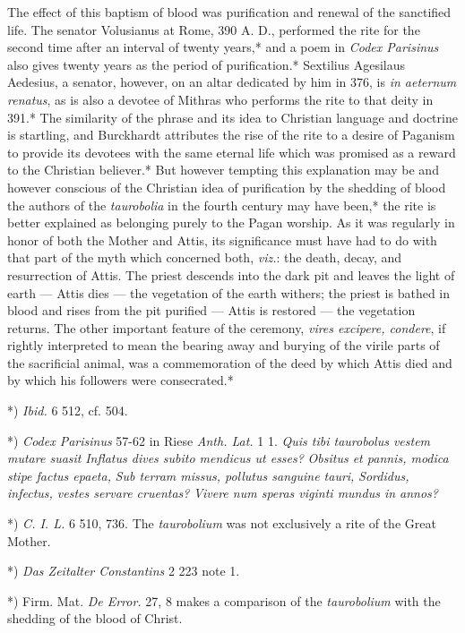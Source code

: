 \documentclass[a4paper, 11pt, oneside, polutonikogreek, english]{article}
\begin{document}
The effect of this baptism of blood was purification and renewal of the sanctified life. The senator Volusianus at Rome, 390 A. D., performed the rite for the second time after an interval of twenty years,* and a poem in \emph{Codex Parisinus} also gives twenty years as the period of purification.* Sextilius Agesilaus Aedesius, a senator, however, on an altar dedicated by him in 376, is \emph{in aeternum renatus}, as is also a devotee of Mithras who performs the rite to that deity in 391.* The similarity of the phrase and its idea to Christian language and doctrine is startling, and Burckhardt attributes the rise of the rite to a desire of Paganism to provide its devotees with the same eternal life which was promised as a reward to the Christian believer.* But however tempting this explanation may be and however conscious of the Christian idea of purification by the shedding of blood the authors of the \emph{taurobolia} in the fourth century may have been,* the rite is better explained as belonging purely to the Pagan worship. As it was regularly in honor of both the Mother and Attis, its significance must have had to do with that part of the myth which concerned both, \emph{viz.}: the death, decay, and resurrection of Attis. The priest descends into the dark pit and leaves the light of earth --- Attis dies --- the vegetation of the earth withers; the priest is bathed in blood and rises from the pit purified --- Attis is restored --- the vegetation returns. The other important feature of the ceremony, \emph{vires excipere, condere}, if rightly interpreted to mean the bearing away and burying of the virile parts of the sacrificial animal, was a commemoration of the deed by which Attis died and by which his followers were consecrated.*

*) \emph{Ibid.} 6 512, cf. 504.

*) \emph{Codex Parisinus} 57-62 in Riese \emph{Anth. Lat.} 1 1.  
\emph{Quis tibi taurobolus vestem mutare suasit}  
\emph{Inflatus dives subito mendicus ut esses?}  
\emph{Obsitus et pannis, modica stipe factus epaeta,}  
\emph{Sub terram missus, pollutus sanguine tauri,}  
\emph{Sordidus, infectus, vestes servare cruentas?}  
\emph{Vivere num speras viginti mundus in annos?}

*) \emph{C. I. L.} 6 510, 736. The \emph{taurobolium} was not exclusively a rite of the Great Mother.

*) \emph{Das Zeitalter Constantins} 2 223 note 1.

*) Firm. Mat. \emph{De Error.} 27, 8 makes a comparison of the \emph{taurobolium} with the shedding of the blood of Christ.
\end{document}
